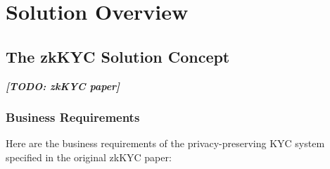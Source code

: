\documentclass[
]{report}
\begin{document}
\chapter{Solution Overview}

\section{The zkKYC Solution Concept}

\textbf{\emph{{[}TODO: zkKYC paper{]}}}

\subsection{Business Requirements}

Here are the business requirements of the privacy-preserving KYC system
specified in the original zkKYC paper:
\end{document}
